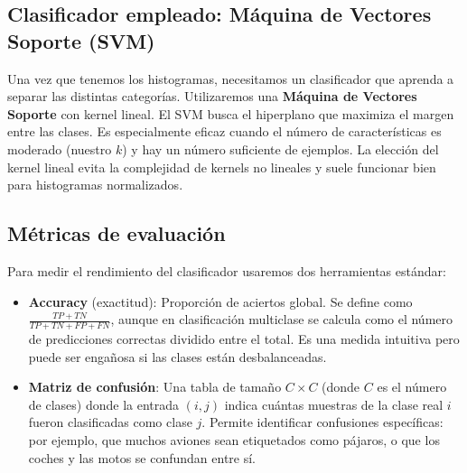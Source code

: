 \documentclass{article}
\begin{document}
\subsection{Clasificador empleado: Máquina de Vectores Soporte (SVM)}
Una vez que tenemos los histogramas, necesitamos un clasificador que aprenda a separar las distintas categorías. Utilizaremos una \textbf{Máquina de Vectores Soporte} con kernel lineal. El SVM busca el hiperplano que maximiza el margen entre las clases. Es especialmente eficaz cuando el número de características es moderado (nuestro $k$) y hay un número suficiente de ejemplos. La elección del kernel lineal evita la complejidad de kernels no lineales y suele funcionar bien para histogramas normalizados.

\subsection{Métricas de evaluación}
Para medir el rendimiento del clasificador usaremos dos herramientas estándar:
\begin{itemize}
    \item \textbf{Accuracy} (exactitud): Proporción de aciertos global. Se define como $\frac{TP + TN}{TP+TN+FP+FN}$, aunque en clasificación multiclase se calcula como el número de predicciones correctas dividido entre el total. Es una medida intuitiva pero puede ser engañosa si las clases están desbalanceadas.
    \item \textbf{Matriz de confusión}: Una tabla de tamaño $C \times C$ (donde $C$ es el número de clases) donde la entrada $(i,j)$ indica cuántas muestras de la clase real $i$ fueron clasificadas como clase $j$. Permite identificar confusiones específicas: por ejemplo, que muchos aviones sean etiquetados como pájaros, o que los coches y las motos se confundan entre sí.
\end{itemize}
\end{document}
